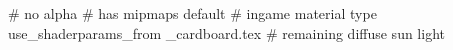 # no alpha
# has mipmaps
default			 # ingame material type
use_shaderparams_from
_cardboard.tex		 # remaining diffuse sun light




